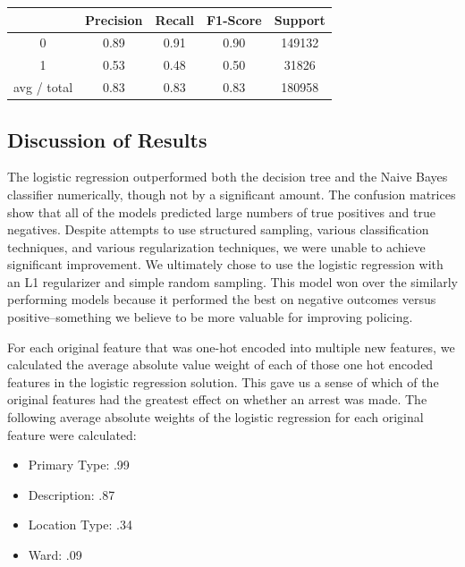 \documentclass[10pt]{SelfArx} %
\begin{document}
    \begin{center}
        \begin{tabular}{|c | c | c | c| c|}
        \hline
        & Precision & Recall & F1-Score & Support \\ [0.5ex]
        \hline\hline
        0 & 0.89 & 0.91 & 0.90 & 149132 \\
        \hline
        1 & 0.53 & 0.48 & 0.50 & 31826 \\
        \hline
        avg / total & 0.83 & 0.83 & 0.83 & 180958 \\
        \hline
        \hline
        \end{tabular}
    \end{center}

    \subsection{Discussion of Results}
    The logistic regression outperformed both the decision tree and the Naive Bayes classifier numerically, though not by a significant amount. The confusion matrices show that all of the models predicted large numbers of true positives and true negatives. Despite attempts to use structured sampling, various classification techniques, and various regularization techniques, we were unable to achieve significant improvement. We ultimately chose to use the logistic regression with an L1 regularizer and simple random sampling. This model won over the similarly performing models because it performed the best on negative outcomes versus positive--something we believe to be more valuable for improving policing.

    For each original feature that was one-hot encoded into multiple new features, we calculated the average absolute value weight of each of those one hot encoded features in the logistic regression solution. This gave us a sense of which of the original features had the greatest effect on whether an arrest was made. The following average absolute weights of the logistic regression for each original feature were calculated:
        \begin{itemize}
            \item Primary Type: .99
            \item Description: .87
            \item Location Type: .34
            \item Ward: .09
        \end{itemize}
\end{document}
